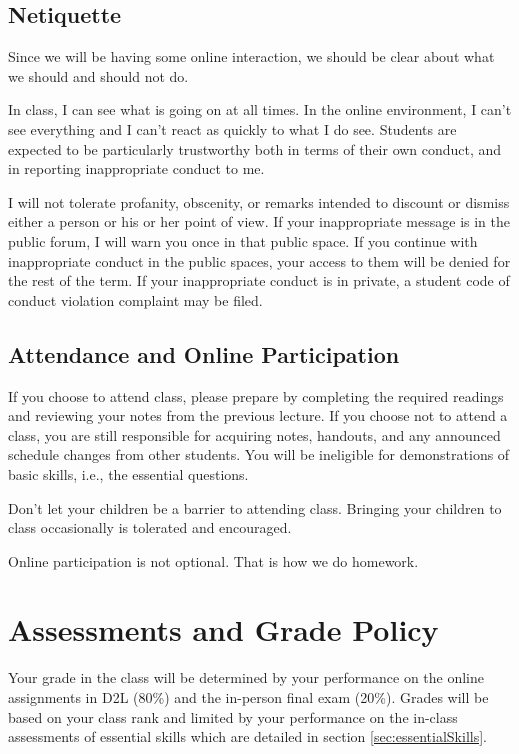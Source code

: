 \documentclass[letterpaper,10pt]{article}
\begin{document}
\subsection{Netiquette}
Since we will be having some online interaction, we should be clear
about what we should and should not do.

In class, I can see what is going on at all times.  In the online
environment, I can't see everything and I can't react as quickly to
what I do see.  Students are expected to be particularly trustworthy
both in terms of their own conduct, and in reporting inappropriate
conduct to me.

I will not tolerate profanity, obscenity, or remarks intended to
discount or dismiss either a person or his or her point of view. If your inappropriate message is in the public forum, I will warn you
once in that public space. If you continue with inappropriate conduct
in the public spaces, your access to them will be denied for the rest
of the term. If your inappropriate
conduct is in private, a student code of conduct violation complaint
may be filed.

 \subsection{Attendance and Online Participation}
 
 If you choose to attend class, please prepare by completing the required readings and reviewing your notes from the previous lecture. If you choose not to attend a class, you are still responsible for acquiring notes, handouts, and any announced schedule changes from other students. You will be ineligible for demonstrations of basic skills, i.e., the essential questions. 
 
 Don’t let your children be a barrier to attending class. Bringing your children to class occasionally is tolerated and encouraged.

Online participation is not optional. That is how we do homework.

\section{Assessments and Grade Policy}

Your grade in the class will be determined by your performance on the online assignments in D2L (80\%) and the in-person final exam (20\%).  Grades will be based on your class rank and limited by your performance on the in-class assessments of essential skills which are detailed in section \ref{sec:essentialSkills}. 
\end{document}
